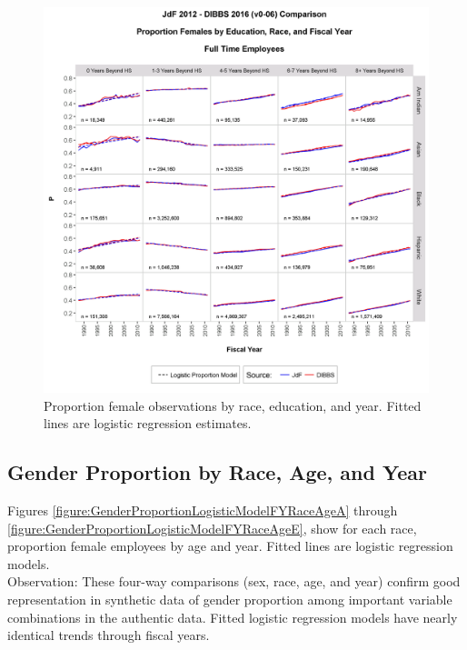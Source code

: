 \documentclass[10pt, letterpaper]{article}
\begin{document}
\begin{spacing}{1.0}
\begin{figure}[h]
    \centering
    \includegraphics[width=6.5in, trim={0 0 0 1in}, clip]{GenderProportionLogisticModelEducationRaceFYScaleFixedv0-06.png}
    \caption{Proportion female observations by race, education, and year.  Fitted lines are logistic regression estimates.}
    \label{figure:GenderProportionLogisticModelEducationRaceFYScaleFixedv0-06}
\end{figure}

\clearpage

\subsection{Gender Proportion by Race, Age, and Year}

Figures \ref{figure:GenderProportionLogisticModelFYRaceAgeA} through \ref{figure:GenderProportionLogisticModelFYRaceAgeE}, show for each race, proportion female employees by age and year.  Fitted lines are logistic regression models.\\

Observation:  These four-way comparisons (sex, race, age, and year) confirm good representation in synthetic data of gender proportion among important variable combinations in the authentic data.  Fitted logistic regression models have nearly identical trends through fiscal years.\\


\end{spacing}
\end{document}
